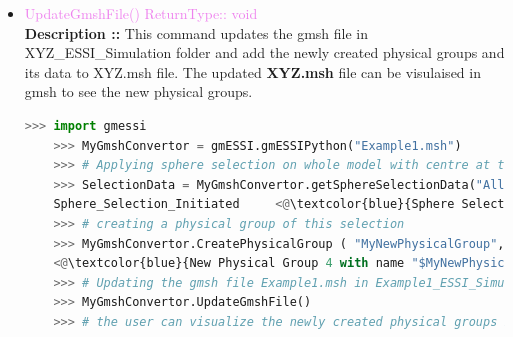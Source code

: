 \documentclass[11pt]{article}
\begin{document}
\begin{itemize}
    \item \textcolor{violet}{ UpdateGmshFile() \hfill {ReturnType:: void}} \\
    \textbf{Description ::} This command updates the gmsh file in XYZ\_ESSI\_Simulation folder and add the newly created physical groups and its data to XYZ.msh file. The updated \textbf{XYZ.msh} file can be visulaised in gmsh to see the new physical groups.
    \begin{lstlisting}[language=Python]
    >>> import gmessi
    >>> MyGmshConvertor = gmESSI.gmESSIPython("Example1.msh")
    >>> # Applying sphere selection on whole model with centre at the cente of the model (2,0.5,0.5) and radius as 2 units
    >>> SelectionData = MyGmshConvertor.getSphereSelectionData("All",2,2,0.5,0.5)
    Sphere_Selection_Initiated     <@\textcolor{blue}{Sphere Selection Made over All Model with radius 2 and center at 2 0.5 0.5}@>
    >>> # creating a physical group of this selection
    >>> MyGmshConvertor.CreatePhysicalGroup ( "MyNewPhysicalGroup", SelectionData.NodeList, SelectionData.ElementList)
    <@\textcolor{blue}{New Physical Group 4 with name "$MyNewPhysicalGroup$" created}@>
    >>> # Updating the gmsh file Example1.msh in Example1_ESSI_Simulation folder
    >>> MyGmshConvertor.UpdateGmshFile()
    >>> # the user can visualize the newly created physical groups if any in gmsh.
    \end{lstlisting}


\end{itemize}
\end{document}
